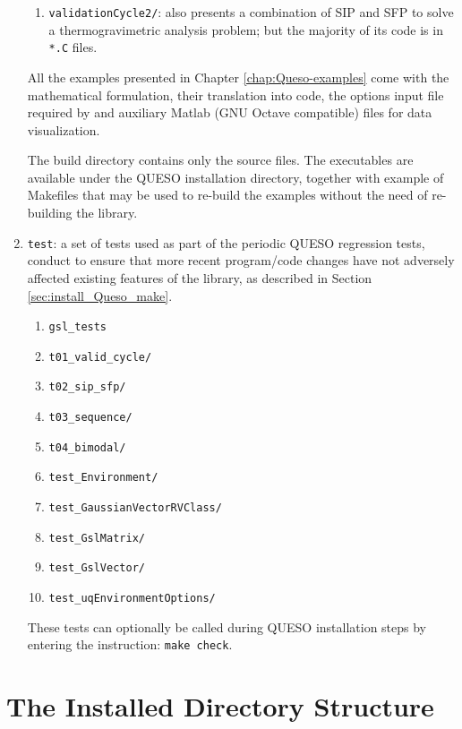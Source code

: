 \begin{enumerate}
\begin{enumerate}
\item \texttt{validationCycle2/}: also presents a combination of SIP and SFP to solve a thermogravimetric analysis problem; but the majority of its code is in \verb+*.C+ files. 
\end{enumerate}

All the examples presented in Chapter \ref{chap:Queso-examples} come with the mathematical formulation, their translation into code, the options input file required by \Queso{} and auxiliary Matlab (GNU Octave compatible) files for data visualization.

The build directory contains only the source files. The executables are available under the QUESO installation directory, together with example of Makefiles that may be used to re-build the examples without the need of re-building the library.

\item  \texttt{test}: a set of tests used as part of the periodic QUESO regression tests, conduct to ensure that more recent program/code changes have not adversely affected existing features of the library, as described in Section \ref{sec:install_Queso_make}. 
\begin{enumerate}
\item \texttt{gsl\_tests}
\item \texttt{t01\_valid\_cycle/}
\item \texttt{t02\_sip\_sfp/}
\item \texttt{t03\_sequence/} 
\item \texttt{t04\_bimodal/} 
\item \texttt{test\_Environment/}
\item \texttt{test\_GaussianVectorRVClass/}
\item \texttt{test\_GslMatrix/}
\item \texttt{test\_GslVector/}
\item \texttt{test\_uqEnvironmentOptions/}
\end{enumerate}

These tests can optionally be called during QUESO installation steps by entering the instruction: \verb+make check+.

\end{enumerate}


\section{The Installed Directory Structure} \label{sc-installed-dir-structure}

